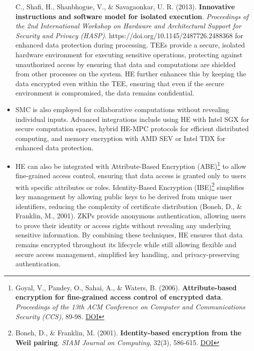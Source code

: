 \documentclass[
  letterpaper,
  DIV=11,
  numbers=noendperiod,
  oneside]{scrartcl}
\begin{document}
\begin{itemize}
{    C., Shafi, H., Shanbhogue, V., \& Savagaonkar, U. R. (2013).
    \textbf{Innovative instructions and software model for isolated
    execution}. \emph{Proceedings of the 2nd International Workshop on
    Hardware and Architectural Support for Security and Privacy (HASP)}.
    https://doi.org/10.1145/2487726.2488368} for enhanced data
  protection during processing. TEEs provide a secure, isolated hardware
  environment for executing sensitive operations, protecting against
  unauthorized access by ensuring that data and computations are
  shielded from other processes on the system. HE further enhances this
  by keeping the data encrypted even within the TEE, ensuring that even
  if the secure environment is compromised, the data remains
  confidential.
\item
  SMC is also employed for collaborative computations without revealing
  individual inputs. Advanced integrations include using HE with Intel
  SGX for secure computation spaces, hybrid HE-MPC protocols for
  efficient distributed computing, and memory encryption with AMD SEV or
  Intel TDX for enhanced data protection.
\item
  HE can also be integrated with Attribute-Based Encryption
  (ABE)\footnote{Goyal, V., Pandey, O., Sahai, A., \& Waters, B. (2006).
    \textbf{Attribute-based encryption for fine-grained access control
    of encrypted data}. \emph{Proceedings of the 13th ACM Conference on
    Computer and Communications Security (CCS)}, 89-98.
    \href{https://doi.org/10.1145/1180405.1180418}{DOI}} to allow
  fine-grained access control, ensuring that data access is granted only
  to users with specific attributes or roles. Identity-Based Encryption
  (IBE)\footnote{Boneh, D., \& Franklin, M. (2001).
    \textbf{Identity-based encryption from the Weil pairing}. \emph{SIAM
    Journal on Computing}, 32(3), 586-615.
    \href{https://doi.org/10.1137/S0097539701398521}{DOI}} simplifies
  key management by allowing public keys to be derived from unique user
  identifiers, reducing the complexity of certificate distribution
  (Boneh, D., \& Franklin, M., 2001). ZKPs provide anonymous
  authentication, allowing users to prove their identity or access
  rights without revealing any underlying sensitive information. By
  combining these techniques, HE ensures that data remains encrypted
  throughout its lifecycle while still allowing flexible and secure
  access management, simplified key handling, and privacy-preserving
  authentication.
\end{itemize}
\end{document}
